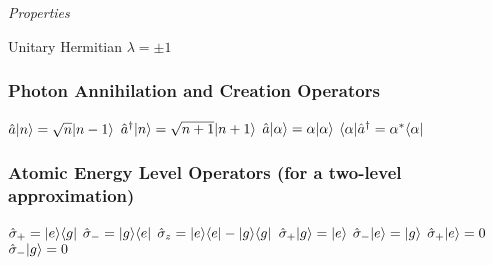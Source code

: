 \textit{Properties}
\begin{itemize}
\itemt Unitary
\itemt Hermitian
\itemt \( \lambda = \pm 1 \)
\end{itemize}

\subsubsection{Photon Annihilation and Creation Operators}			
\begin{itemize}
\itemt \( \hat{a}\lvert n\rangle = \sqrt{n}\lvert n-1\rangle \)
\itemt \( \hat{a}^\dagger\lvert n\rangle = \sqrt{n+1}\lvert n+1\rangle \)
\itemt \( \hat{a}\lvert\alpha\rangle = \alpha\lvert\alpha\rangle \)
\itemt \( \langle\alpha\rvert\hat{a}^\dagger = \alpha^*\langle\alpha\rvert \)
\end{itemize}

\subsubsection{Atomic Energy Level Operators (for a two-level approximation)}	
\begin{itemize}
\itemt \( \hat{\sigma}_+ = \lvert e\rangle\langle g\rvert \)
\itemt \( \hat{\sigma}_- = \lvert g\rangle\langle e\rvert \)
\itemt \( \hat{\sigma}_z = \lvert e\rangle\langle e\rvert - \lvert g\rangle\langle g\rvert \)
\itemt \( \hat{\sigma}_+\lvert g\rangle = \lvert e\rangle \)
\itemt \( \hat{\sigma}_-\lvert e\rangle = \lvert g\rangle \)
\itemt \( \hat{\sigma}_+\lvert e\rangle = 0 \)
\itemt \( \hat{\sigma}_-\lvert g\rangle = 0 \)
\end{itemize}